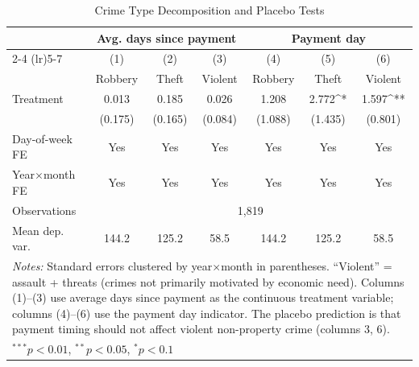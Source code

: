 \begin{table}[t]
\centering
\caption{Crime Type Decomposition and Placebo Tests}
\label{tab:decomp}
\begin{tabular}{lcccccc}
\hline\hline
 & \multicolumn{3}{c}{Avg. days since payment} & \multicolumn{3}{c}{Payment day} \\
\cmidrule(lr){2-4} \cmidrule(lr){5-7}
 & (1) & (2) & (3) & (4) & (5) & (6) \\
 & Robbery & Theft & Violent & Robbery & Theft & Violent \\
\hline
Treatment & 0.013 & 0.185 & 0.026 & 1.208 & 2.772^{*} & 1.597^{**} \\
 & (0.175) & (0.165) & (0.084) & (1.088) & (1.435) & (0.801) \\
Day-of-week FE & Yes & Yes & Yes & Yes & Yes & Yes \\
Year$\times$month FE & Yes & Yes & Yes & Yes & Yes & Yes \\
Observations & \multicolumn{6}{c}{1,819} \\
Mean dep. var. & 144.2 & 125.2 & 58.5 & 144.2 & 125.2 & 58.5 \\
\hline
\multicolumn{7}{p{0.95\textwidth}}{\footnotesize \textit{Notes:} Standard errors clustered by year$\times$month in parentheses. ``Violent'' = assault + threats (crimes not primarily motivated by economic need). Columns (1)--(3) use average days since payment as the continuous treatment variable; columns (4)--(6) use the payment day indicator. The placebo prediction is that payment timing should not affect violent non-property crime (columns 3, 6).} \\
\multicolumn{7}{l}{\footnotesize $^{***}p<0.01$, $^{**}p<0.05$, $^{*}p<0.1$} \\
\end{tabular}
\end{table}

